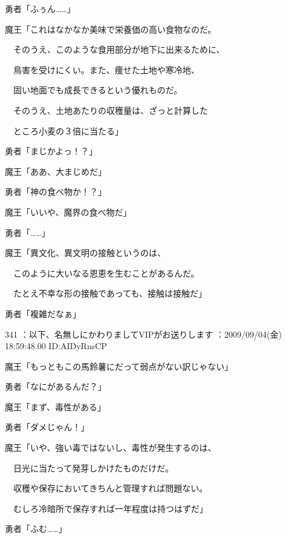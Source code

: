 \documentclass[a4j,twocolumn]{tarticle}
\begin{document}
勇者「ふぅん……」 



魔王「これはなかなか美味で栄養価の高い食物なのだ。\par{} 
　そのうえ、このような食用部分が地下に出来るために、\par{} 
　鳥害を受けにくい。また、痩せた土地や寒冷地、\par{} 
　固い地面でも成長できるという優れものだ。\par{} 
　そのうえ、土地あたりの収穫量は、ざっと計算した\par{} 
　ところ小麦の３倍に当たる」 



勇者「まじかよっ！？」 



魔王「ああ、大まじめだ」 



勇者「神の食べ物か！？」 



魔王「いいや、魔界の食べ物だ」\par{} 
勇者「……」 



魔王「異文化、異文明の接触というのは、\par{} 
　このように大いなる恩恵を生むことがあるんだ。\par{} 
　たとえ不幸な形の接触であっても、接触は接触だ」 



勇者「複雑だなぁ」 

	
    
    

341 ：以下、名無しにかわりましてVIPがお送りします ：2009/09/04(金) 18:59:48.00 ID:AIDyRnsCP 


魔王「もっともこの馬鈴薯にだって弱点がない訳じゃない」\par{} 
勇者「なにがあるんだ？」 



魔王「まず、毒性がある」\par{} 
勇者「ダメじゃん！」 



魔王「いや、強い毒ではないし、毒性が発生するのは、\par{} 
　日光に当たって発芽しかけたものだけだ。\par{} 
　収穫や保存においてきちんと管理すれば問題ない。\par{} 
　むしろ冷暗所で保存すれば一年程度は持つはずだ」 



勇者「ふむ……」 
\end{document}

